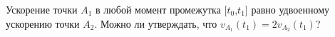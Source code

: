 Ускорение точки $A_{1}$ в любой момент промежутка $[t_{0}$,$t_{1}]$ 
равно удвоенному ускорению точки $A_{2}$. Можно ли утверждать, что 
$v_{A_{1}}(t_{1})=2v_{A_{2}}(t_{1})$?
